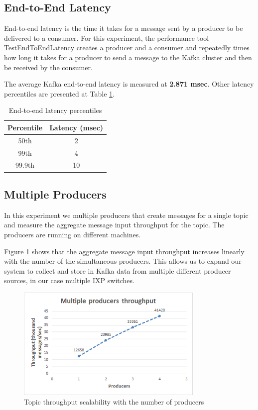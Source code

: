 \subsection{End-to-End Latency}

End-to-end latency is the time it takes for a message sent by a producer to be delivered to a consumer. For this experiment, the performance tool TestEndToEndLatency creates a producer and a consumer and repeatedly times how long it takes for a producer to send a message to the Kafka cluster and then be received by the consumer. 

The average Kafka end-to-end latency is measured at \textbf{2.871 msec}. Other latency percentiles are presented at Table \ref{table:end-to-end_latency}.

\begin{table}[H]
\centering
\begin{tabular}{ |c|c| }
\hline
Percentile & Latency (msec) \\ \hline \hline
50th & 2 \\ \hline
99th & 4 \\ \hline
99.9th & 10 \\ \hline
\end{tabular}
\caption{End-to-end latency percentiles}
\label{table:end-to-end_latency}
\end{table}

\subsection{Multiple Producers}

In this experiment we multiple producers that create messages for a single topic and measure the aggregate message input throughput for the topic. The producers are running on different machines.

Figure \ref{figure:benchmarks_kafka_producers} shows that the aggregate message input throughput increases linearly with the number of the simultaneous producers. This allows us to expand our system to collect and store in Kafka data from multiple different producer sources, in our case multiple IXP switches.

\begin{figure}[H]
\centering
\includegraphics[width=0.8\textwidth]{figures/benchmarks_kafka_producers}
\caption{Topic throughput scalability with the number of producers}
\label{figure:benchmarks_kafka_producers}
\end{figure}

